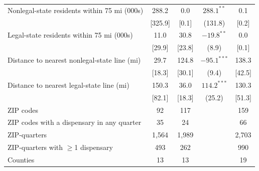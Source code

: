 \begin{tabular}{@{}lcccc@{}}
Nonlegal-state residents within 75 mi (000s) & 288.2 & 0.0 & $288.1^{**}$ & 0.1 \\
 & [325.9] & [0.1] & (131.8) & [0.2] \\
Legal-state residents within 75 mi (000s) & 11.0 & 30.8 & $-19.8^{**}$ & 0.0 \\
 & [29.9] & [23.8] & (8.9) & [0.1] \\
Distance to nearest nonlegal-state line (mi) & 29.7 & 124.8 & $-95.1^{***}$ & 138.3 \\
 & [18.3] & [30.1] & (9.4) & [42.5] \\
Distance to nearest legal-state line (mi) & 150.3 & 36.0 & $114.2^{***}$ & 130.3 \\
 & [82.1] & [18.3] & (25.2) & [51.3] \\
\midrule
ZIP codes & 92 & 117 &  & 159 \\
ZIP codes with a dispensary in any quarter & 35 & 24 &  & 66 \\
ZIP-quarters & 1,564 & 1,989 &  & 2,703 \\
ZIP-quarters with $\geq$1 dispensary & 493 & 262 &  & 990 \\
Counties & 13 & 13 &  & 19 \\
\bottomrule
\end{tabular}
